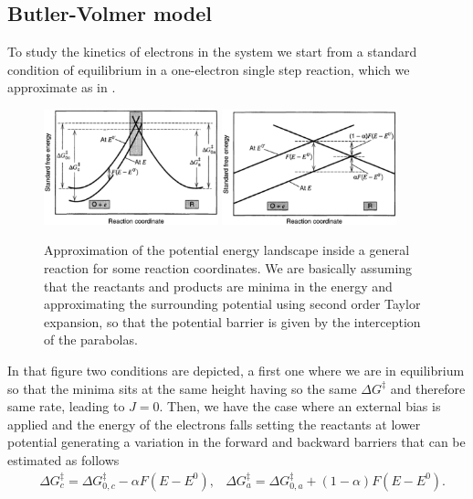 \subsection{Butler-Volmer model}

To study the kinetics of electrons in the system we start from a standard condition of equilibrium in a one-electron single step reaction, which we approximate as in .
\begin{figure}[t]
    \centering
    \includegraphics[width=0.45\textwidth]{Immagini/ButlerVolmer.png}
    \includegraphics[width=0.45\textwidth]{Immagini/ButlerVolmer2.png}
    \caption{
        Approximation of the potential energy landscape inside a general reaction for some reaction coordinates. We are basically assuming that the reactants and products are minima in the energy and approximating the surrounding potential using second order Taylor expansion, so that the potential barrier is given by the interception of the parabolas.
    }
    \label{fig:ButlerVolmer}
\end{figure}
In that figure two conditions are depicted, a first one where we are in equilibrium so that the minima sits at the same height having so the same $\Delta G^\ddagger$ and therefore same rate, leading to $J = 0$. Then, we have the case where an external bias is applied and the energy of the electrons falls setting the reactants at lower potential generating a variation in the forward and backward barriers that can be estimated as follows
\begin{align*}
    &\Delta G_c^\ddagger = \Delta G_{0,c}^\ddagger - \alpha F(E - E^0), &\Delta G_a^\ddagger = \Delta G_{0,a}^\ddagger + (1 - \alpha) F(E - E^0).
\end{align*} 
